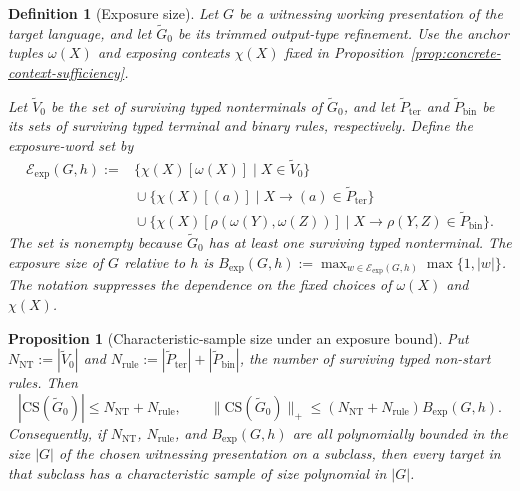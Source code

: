 \documentclass[11pt,a4paper]{article}
\newtheorem{proposition}[theorem]{Proposition}
\newtheorem{definition}[theorem]{Definition}
\theoremstyle{remark}
\newcommand{\CS}{\mathrm{CS}}
\begin{document}
\begin{definition}[Exposure size]
\label{def:exposure-size}
Let \(G\) be a witnessing working presentation of the target language, and let
\(\widetilde G_0\) be its trimmed output-type refinement.  Use the anchor tuples
\(\omega(X)\) and exposing contexts \(\chi(X)\) fixed in
Proposition~\ref{prop:concrete-context-sufficiency}.

Let \(\widetilde V_0\) be the set of surviving typed nonterminals of
\(\widetilde G_0\), and let \(\widetilde P_{\mathrm{ter}}\) and
\(\widetilde P_{\mathrm{bin}}\) be its sets of surviving typed terminal and
binary rules, respectively.  Define the exposure-word set by
\[
\begin{aligned}
\mathcal E_{\mathrm{exp}}(G,h):={}&
 \{\chi(X)[\omega(X)]\mid X\in\widetilde V_0\}\\
&{}\cup\{\chi(X)[(a)]\mid X\to(a)\in\widetilde P_{\mathrm{ter}}\}\\
&{}\cup\{\chi(X)[\rho(\omega(Y),\omega(Z))]\mid
          X\to\rho(Y,Z)\in\widetilde P_{\mathrm{bin}}\}.
\end{aligned}
\]
The set is nonempty because \(\widetilde G_0\) has at least one surviving
typed nonterminal.  The \emph{exposure size} of \(G\) relative to \(h\) is
\(B_{\mathrm{exp}}(G,h):=
\max_{w\in\mathcal E_{\mathrm{exp}}(G,h)}\max\{1,|w|\}\).
The notation suppresses the dependence on the fixed choices of \(\omega(X)\)
and \(\chi(X)\).
\end{definition}

\begin{proposition}[Characteristic-sample size under an exposure bound]
\label{prop:cs-exposure-bound}
Put \(N_{\mathrm{NT}}:=|\widetilde V_0|\) and
\(N_{\mathrm{rule}}:=|\widetilde P_{\mathrm{ter}}|+
|\widetilde P_{\mathrm{bin}}|\), the number of surviving typed non-start rules.
Then
\[
  |\CS(\widetilde G_0)|\le N_{\mathrm{NT}}+N_{\mathrm{rule}},
  \qquad
  \|\CS(\widetilde G_0)\|_+
  \le (N_{\mathrm{NT}}+N_{\mathrm{rule}})B_{\mathrm{exp}}(G,h).
\]
Consequently, if \(N_{\mathrm{NT}}\), \(N_{\mathrm{rule}}\), and
\(B_{\mathrm{exp}}(G,h)\) are all polynomially bounded in the size \(|G|\) of
the chosen witnessing presentation on a subclass, then every target in that
subclass has a characteristic sample of size polynomial in \(|G|\).
\end{proposition}
\end{document}
